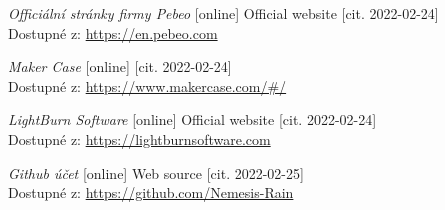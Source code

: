 \begin{thebibliography}{99}
\textit{Officiální stránky firmy Pebeo} [online] Official website [cit. 2022-02-24] \\
Dostupné z: \url{https://en.pebeo.com} 

\textit{Maker Case} [online] [cit. 2022-02-24] \\
Dostupné z: \url{https://www.makercase.com/#/}

\textit{LightBurn Software} [online] Official website [cit. 2022-02-24] \\
Dostupné z: \url{https://lightburnsoftware.com} 

\textit{Github účet} [online] Web source [cit. 2022-02-25] \\
Dostupné z: \url{https://github.com/Nemesis-Rain} 


\end{thebibliography}
